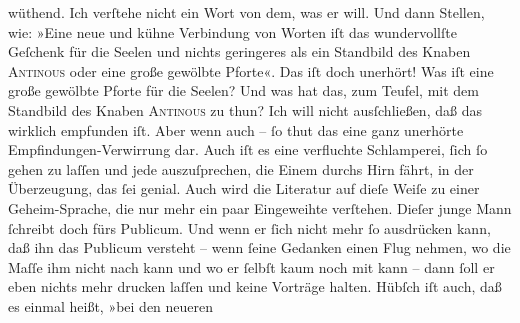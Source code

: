 \begin{ledgroupsized}[t]{13cm}
               wüthend. Ich verſtehe nicht ein Wort von dem, was er will. Und dann Stellen, wie:
                  »Eine neue und kühne Verbindung
                  von Worten iſt das wundervollſte Geſchenk für die Seelen und nichts geringeres als
                  ein Standbild des Knaben \textsc{Antinous} oder eine große gewölbte Pforte«. Das iſt doch unerhört! Was iſt eine
               große gewölbte {\pb}Pforte für die Seelen? Und was hat
               das, zum Teufel, mit dem Standbild des Knaben \textsc{Antinous} zu thun? Ich will nicht ausſchließen, daß das wirklich empfunden iſt. Aber wenn
               auch – ſo thut das eine ganz unerhörte Empfindungen-Verwirrung dar. Auch iſt es eine
               verfluchte Schlamperei, ſich ſo gehen zu laſſen und jede \label{K_L02775-22v}\label{K_L02775-22h} auszuſprechen, die Einem durchs Hirn fährt,  in der Überzeugung, das {\pb}ſei genial. Auch
               wird die Literatur auf dieſe Weiſe zu einer Geheim-Sprache, die nur mehr ein paar
               Eingeweihte verſtehen. Dieſer junge Mann ſchreibt doch fürs Publicum. Und wenn er ſich nicht mehr
               ſo ausdrücken kann, daß ihn das Publicum versteht – wenn ſeine Gedanken einen Flug
               nehmen, {\pb}wo die Maſſe ihm nicht nach kann und wo er
               ſelbſt kaum noch mit kann – dann ſoll er eben  nichts mehr drucken laſſen und keine Vorträge halten. Hübſch iſt auch, daß es
               einmal heißt, »bei den neueren

\end{ledgroupsized}
